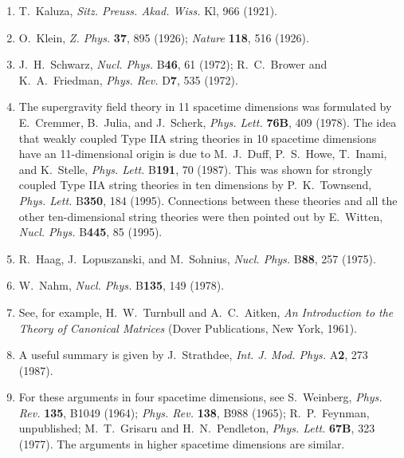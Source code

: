 \begin{enumerate}
  \item {}\label{ch32-ref-1}
  T.~Kaluza, \textit{Sitz. Preuss. Akad. Wiss.} Kl, 966 (1921).

  \item {}\label{ch32-ref-2}
  O.~Klein, \textit{Z. Phys.} \textbf{37}, 895 (1926);
  \textit{Nature} \textbf{118}, 516 (1926).

  \item {}\label{ch32-ref-3}
  J.~H.~Schwarz, \textit{Nucl. Phys.} B\textbf{46}, 61 (1972);
  R.~C.~Brower and K.~A.~Friedman, \textit{Phys. Rev.} D\textbf{7},
  535 (1972).

  \item {}\label{ch32-ref-4}
  The supergravity field theory in 11 spacetime dimensions was
  formulated by E.~Cremmer, B.~Julia, and J.~Scherk,
  \textit{Phys. Lett.} \textbf{76B}, 409 (1978). The idea that weakly
  coupled Type IIA string theories in 10 spacetime dimensions have an
  11-dimensional origin is due to M.~J.~Duff, P.~S.~Howe, T.~Inami,
  and K.~Stelle, \textit{Phys. Lett.} B\textbf{191}, 70 (1987). This
  was shown for strongly coupled Type IIA string theories in ten
  dimensions by P.~K.~Townsend, \textit{Phys. Lett.} B\textbf{350},
  184 (1995). Connections between these theories and all the other
  ten-dimensional string theories were then pointed out by E.~Witten,
  \textit{Nucl. Phys.} B\textbf{445}, 85 (1995).

  \item {}\label{ch32-ref-5}
  R.~Haag, J.~Lopuszanski, and M.~Sohnius, \textit{Nucl. Phys.}
  B\textbf{88}, 257 (1975).

  \item {}\label{ch32-ref-6}
  W.~Nahm, \textit{Nucl. Phys.} B\textbf{135}, 149 (1978).

  \item[6a.] \label{ch32-ref-6a}
  See, for example, H.~W.~Turnbull and A.~C.~Aitken,
  \textit{An Introduction to the Theory of Canonical Matrices}
  (Dover Publications, New York, 1961).

  \item[6b.] \label{ch32-ref-6b}
  A useful summary is given by J.~Strathdee, \textit{Int. J. Mod.
  Phys.} A\textbf{2}, 273 (1987).

  \item {}\label{ch32-ref-7}
  For these arguments in four spacetime dimensions, see S.~Weinberg,
  \textit{Phys. Rev.} \textbf{135}, B1049 (1964);
  \textit{Phys. Rev.} \textbf{138}, B988 (1965); R.~P.~Feynman,
  unpublished; M.~T.~Grisaru and H.~N.~Pendleton,
  \textit{Phys. Lett.} \textbf{67B}, 323 (1977). The arguments in
  higher spacetime dimensions are similar.


\end{enumerate}
